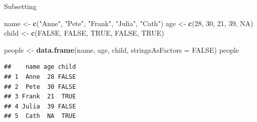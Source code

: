 \documentclass[ignorenonframetext,]{beamer}
\newenvironment{Shaded}{\begin{snugshade}}{\end{snugshade}}
\newcommand{\DataTypeTok}[1]{\textcolor[rgb]{0.13,0.29,0.53}{#1}}
\newcommand{\DecValTok}[1]{\textcolor[rgb]{0.00,0.00,0.81}{#1}}
\newcommand{\KeywordTok}[1]{\textcolor[rgb]{0.13,0.29,0.53}{\textbf{#1}}}
\newcommand{\NormalTok}[1]{#1}
\newcommand{\OtherTok}[1]{\textcolor[rgb]{0.56,0.35,0.01}{#1}}
\newcommand{\StringTok}[1]{\textcolor[rgb]{0.31,0.60,0.02}{#1}}
\begin{document}
\begin{frame}[fragile]{Subsetting}
\protect\hypertarget{subsetting-1}{}

\begin{Shaded}
\begin{Highlighting}[]
\NormalTok{name <-}\StringTok{ }\KeywordTok{c}\NormalTok{(}\StringTok{"Anne"}\NormalTok{, }\StringTok{"Pete"}\NormalTok{, }\StringTok{"Frank"}\NormalTok{, }\StringTok{"Julia"}\NormalTok{, }\StringTok{"Cath"}\NormalTok{) }
\NormalTok{age <-}\StringTok{ }\KeywordTok{c}\NormalTok{(}\DecValTok{28}\NormalTok{, }\DecValTok{30}\NormalTok{, }\DecValTok{21}\NormalTok{, }\DecValTok{39}\NormalTok{, }\OtherTok{NA}\NormalTok{)}
\NormalTok{child <-}\StringTok{ }\KeywordTok{c}\NormalTok{(}\OtherTok{FALSE}\NormalTok{, }\OtherTok{FALSE}\NormalTok{, }\OtherTok{TRUE}\NormalTok{, }\OtherTok{FALSE}\NormalTok{, }\OtherTok{TRUE}\NormalTok{)}

\NormalTok{people <-}\StringTok{ }\KeywordTok{data.frame}\NormalTok{(name, age, child, }
                     \DataTypeTok{stringsAsFactors =} \OtherTok{FALSE}\NormalTok{)}
\NormalTok{people}
\end{Highlighting}
\end{Shaded}

\begin{verbatim}
##    name age child
## 1  Anne  28 FALSE
## 2  Pete  30 FALSE
## 3 Frank  21  TRUE
## 4 Julia  39 FALSE
## 5  Cath  NA  TRUE
\end{verbatim}

\end{frame}
\end{document}
